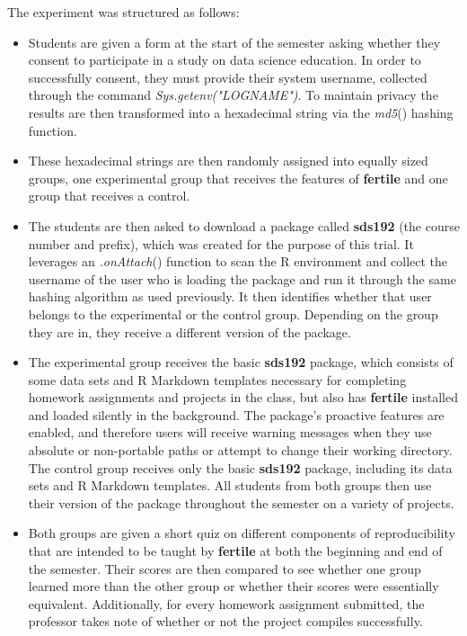 \documentclass[APA,LATO1COL]{WileyNJD-v2}\usepackage[]{graphicx}\usepackage[]{color}
\newcommand{\R}{\textsf{R}\xspace}
\newcommand{\cmd}[1]{\textit{#1}}
\newcommand{\pkg}[1]{\textbf{#1}}
\newcommand{\func}[1]{\textit{#1}()}
\begin{document}
The experiment was structured as follows:

\begin{itemize}[noitemsep]

\item Students are given a form at the start of the semester asking whether they consent to participate in a study on data science education. In order to successfully consent, they must provide their system username, collected through the command \cmd{Sys.getenv("LOGNAME")}. To maintain privacy the results are then transformed into a hexadecimal string via the \func{md5} hashing function. 

\item These hexadecimal strings are then randomly assigned into equally sized groups, one experimental group that receives the features of \pkg{fertile} and one group that receives a control.

\item The students are then asked to download a package called \pkg{sds192} (the course number and prefix), which was created for the purpose of this trial. It leverages an \func{.onAttach} function to scan the \R environment and collect the username of the user who is loading the package and run it through the same hashing algorithm as used previously. It then identifies whether that user belongs to the experimental or the control group. Depending on the group they are in, they receive a different version of the package.

\item The experimental group receives the basic \pkg{sds192} package, which consists of some data sets and \R Markdown templates necessary for completing homework assignments and projects in the class, but also has \pkg{fertile} installed and loaded silently in the background. The package's proactive features are enabled, and therefore users will receive warning messages when they use absolute or non-portable paths or attempt to change their working directory. The control group receives only the basic \pkg{sds192} package, including its data sets and \R Markdown templates. All students from both groups then use their version of the package throughout the semester on a variety of projects.

\item Both groups are given a short quiz on different components of reproducibility that are intended to be taught by \pkg{fertile} at both the beginning and end of the semester. Their scores are then compared to see whether one group learned more than the other group or whether their scores were essentially equivalent. Additionally, for every homework assignment submitted, the professor takes note of whether or not the project compiles successfully.

\end{itemize}
\end{document}
